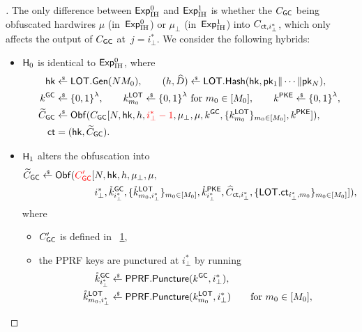 \begin{figure}

\label{fig:circuit-create-gc-proof}
\end{figure}

\begin{proof}[]
The only difference between ${\smash{\mathsf{Exp}}_{\textup{IH}}^{0}}$ and ${\smash{\mathsf{Exp}}_{\textup{IH}}^{1}}$ is whether the $C_{\smash{\mathsf{GC}}}$ being obfuscated hardwires $\mu$ (in~${\smash{\mathsf{Exp}}_{\textup{IH}}^{0}}$) or $\mu_\bot$ (in~${\smash{\mathsf{Exp}}_{\textup{IH}}^{1}}$) into $C_{\ct,i_\bot^\ast}$, which only affects the output of $C_{\smash{\mathsf{GC}}}$ at~${j=i_\bot^\ast}$.
We consider the following hybrids:
\begin{itemize}
\item ${\smash{\mathsf{H}}}_0$ is identical to ${\smash{\mathsf{Exp}}_{\textup{IH}}^{0}}$, where
\begin{align*}
\hk&{}\draws\LOT.\Gen(NM_0),\qquad
(h,\widehat{D})\draws\LOT.\Hash(\hk,\pk_1\concat\cdots\concat\pk_N),\\
k^\GC&{}\draws\bit^\lambda,\qquad
k^\LOT_{m_0}\draws\bit^\lambda\textup{ for }m_0\in[M_0],\qquad
k^\PKE\draws\bit^\lambda,\\
\widetilde{C}_\GC&{}\draws\Obf(C_\GC[
N,\hk,h,{\color{red}i_\bot^\ast-1},\mu_\bot,\mu,k^\GC,\{k^\LOT_{m_0}\}_{m_0\in[M_0]},k^\PKE
]),\\
\ct&{}=(\hk,\widetilde{C}_\GC).
\end{align*}
\item ${\smash{\mathsf{H}}}_1$ alters the obfuscation into
\begin{align*}
\WideNarrow{}{\hspace*{-1.5em}}
\widetilde{C}_\GC\draws\Obf({\color{red}C_\GC'}[
{}&
N,\hk,h,\mu_\bot,\mu,
\\ &
i_\bot^\ast,
\mathring{k}^\GC_{i_\bot^\ast},
\{\mathring{k}^\LOT_{m_0,i_\bot^\ast}\}_{m_0\in[M_0]},
\mathring{k}^\PKE_{i_\bot^\ast},
\widehat{C}_{\ct,i_\bot^\ast},
\{\LOT.\ct_{i_\bot^\ast,m_0}\}_{m_0\in[M_0]}
]),
\end{align*}
where
\begin{itemize}
\item $C_{\smash{\mathsf{GC}}}'$ is defined in \Figure~\ref{fig:circuit-create-gc-proof},
\item the PPRF keys are punctured at $i_\bot^\ast$ by running
\begin{align*}
\mathring{k}^\GC_{i_\bot^\ast}&{}\draws\PPRF.\Puncture(k^\GC,i_\bot^\ast),\\
\mathring{k}^\LOT_{m_0,i_\bot^\ast}&{}\draws\PPRF.\Puncture(k^\LOT_{m_0},i_\bot^\ast)
\qquad\textup{for }m_0\in[M_0],\\

\end{align*}
\end{itemize}
\end{itemize}
\end{proof}
